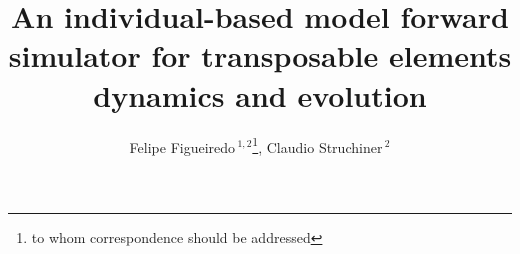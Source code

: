 \documentclass{bioinfo}
\begin{document}

\title[Transposable Elements forward simulator]{An individual-based
  model forward simulator for transposable elements dynamics and
  evolution}

\author[Figueiredo \& Struchiner]{Felipe Figueiredo\,$^{1,2}$\footnote{to whom correspondence
    should be addressed}, Claudio Struchiner\,$^{2}$}

\address{$^{1}$Programa de Biologia Computacional e Sistemas, Instituto
  Oswaldo Cruz (BCS/IOC/Fiocruz)\\ $^{2}$Programa de Computação
  Científica, PROCC/Fiocruz}


\maketitle
\end{document}
